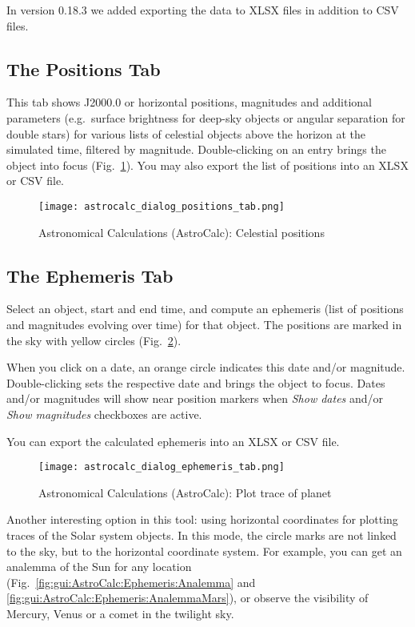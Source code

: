 In version 0.18.3  we added exporting the data to XLSX files in addition to CSV files.

\subsection{The Positions Tab}
\label{sec:gui:AstroCalc:Positions}

This tab  shows J2000.0 or horizontal positions, magnitudes and additional parameters 
(e.g.\ surface brightness for deep-sky objects or angular separation for double stars) for various 
lists of celestial objects above the horizon at the simulated time, filtered by magnitude. 
Double-clicking on an entry brings the object into focus (Fig.~\ref{fig:gui:AstroCalc:Positions}). 
You may also export the list of positions into an XLSX or CSV file.


\begin{figure}[htbp]
\centering\texttt{[image: astrocalc\_dialog\_positions\_tab.png]}
\caption{Astronomical Calculations (AstroCalc): Celestial positions}
\label{fig:gui:AstroCalc:Positions}
\end{figure}

\subsection{The Ephemeris Tab}
\label{sec:gui:AstroCalc:Ephemeris}

Select an object, start and end time, and compute an ephemeris (list of positions and magnitudes evolving over time) for that object. 
The positions are marked in the sky with yellow circles (Fig.~\ref{fig:gui:AstroCalc:Ephemeris}). 

When you click on a date, an orange circle indicates this date and/or magnitude. 
Double-clicking sets the respective date and brings the object to focus. 
Dates and/or magnitudes will show near position markers when \emph{Show dates} and/or \emph{Show magnitudes} checkboxes are active.

You can export the calculated ephemeris into an XLSX or CSV file. 

\begin{figure}[tbp]
\centering\texttt{[image: astrocalc\_dialog\_ephemeris\_tab.png]}
\caption{Astronomical Calculations (AstroCalc): Plot trace of planet}
\label{fig:gui:AstroCalc:Ephemeris}
\end{figure}

Another interesting option in this tool: using horizontal coordinates for plotting traces of the Solar system objects. 
In this mode, the circle marks are not linked to the sky, but to the horizontal coordinate system.
For example, you can get an analemma of the Sun for any location (Fig.~\ref{fig:gui:AstroCalc:Ephemeris:Analemma} and \ref{fig:gui:AstroCalc:Ephemeris:AnalemmaMars}), 
or observe the visibility of Mercury, Venus or a comet in the twilight sky.

